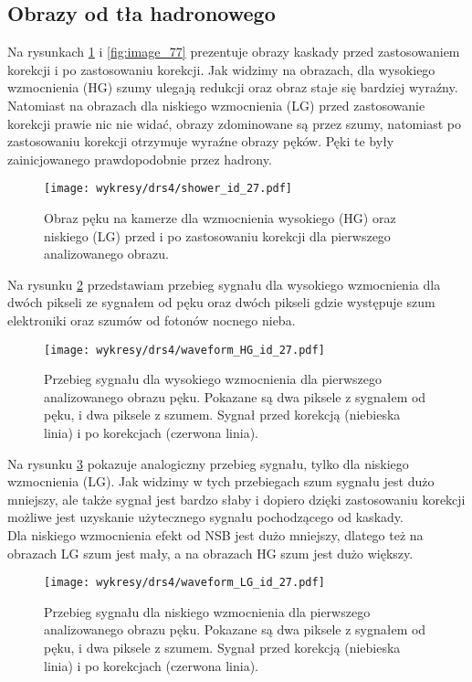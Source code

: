\documentclass[a4paper,11pt,twoside]{article}
\begin{document}
\subsection{Obrazy od tła hadronowego}
Na rysunkach \ref{fig:image_27_map} i \ref{fig:image_77} prezentuje obrazy kaskady przed zastosowaniem korekcji i po zastosowaniu korekcji. Jak widzimy na obrazach, dla wysokiego wzmocnienia (HG) szumy ulegają redukcji oraz obraz staje się bardziej wyraźny. Natomiast na obrazach dla niskiego wzmocnienia (LG) przed zastosowanie korekcji prawie nic nie widać, obrazy zdominowane są przez szumy, natomiast po zastosowaniu korekcji otrzymuje wyraźne obrazy pęków. Pęki te były zainicjowanego prawdopodobnie przez hadrony. 
\begin{figure}[H] 
\centering
\texttt{[image: wykresy/drs4/shower\_id\_27.pdf]}
\caption{Obraz pęku na kamerze dla wzmocnienia wysokiego (HG) oraz niskiego (LG) przed i po zastosowaniu korekcji dla pierwszego analizowanego obrazu.}
\label{fig:image_27_map}
\end{figure}
Na rysunku \ref{fig:waveform_27_hg} przedstawiam przebieg sygnału dla wysokiego wzmocnienia dla dwóch pikseli ze sygnałem od pęku oraz dwóch pikseli gdzie występuje szum elektroniki oraz szumów od fotonów nocnego nieba. 
\begin{figure}[H] 
\centering
\texttt{[image: wykresy/drs4/waveform\_HG\_id\_27.pdf]}
\caption{Przebieg sygnału dla wysokiego wzmocnienia dla pierwszego analizowanego obrazu pęku. Pokazane są dwa piksele z sygnałem od pęku, i dwa piksele z szumem. Sygnał przed korekcją (niebieska linia) i po korekcjach (czerwona linia).}
\label{fig:waveform_27_hg}
\end{figure}
Na rysunku \ref{fig:waveform_27_lg} pokazuje analogiczny przebieg sygnału, tylko dla niskiego wzmocnienia (LG). Jak widzimy w tych przebiegach szum sygnału jest dużo mniejszy, ale także sygnał jest bardzo słaby i dopiero dzięki zastosowaniu korekcji możliwe jest uzyskanie użytecznego sygnału pochodzącego od kaskady. \\
Dla niskiego wzmocnienia efekt od NSB jest dużo mniejszy, dlatego też na obrazach LG szum jest mały, a na obrazach HG szum jest dużo większy.
\begin{figure}[H] 
\centering
\texttt{[image: wykresy/drs4/waveform\_LG\_id\_27.pdf]}
\caption{Przebieg sygnału dla niskiego wzmocnienia dla pierwszego analizowanego obrazu pęku. Pokazane są dwa piksele z sygnałem od pęku, i dwa piksele z szumem. Sygnał przed korekcją (niebieska linia) i po korekcjach (czerwona linia).}
\label{fig:waveform_27_lg}
\end{figure}
\end{document}
